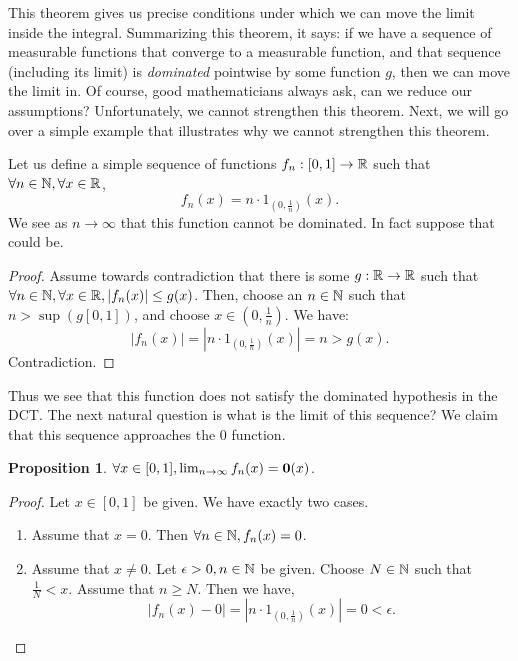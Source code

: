 \documentclass{article}
\theoremstyle{axiom} \newtheorem{axiom}{Axiom}
\theoremstyle{definition} \newtheorem{definition}{Definition}
\theoremstyle{example} \newtheorem{example}{Example}
\theoremstyle{proposition} \newtheorem{prop}{Proposition}
\theoremstyle{lemma} \newtheorem{lemma}{Lemma}
\begin{document}
This theorem gives us precise conditions under which we can move the limit
inside the integral. Summarizing this theorem, it says: if we have a sequence of
measurable functions that converge to a measurable function, and that sequence
(including its limit) is \textit{dominated} pointwise by some function $g$,
then we can move the limit in. Of course, good mathematicians always ask, can we reduce our
assumptions? Unfortunately, we cannot strengthen this theorem. Next, we will go
over a simple example that illustrates why we cannot strengthen this theorem.

Let us define a simple sequence of functions $f_n: [0,1] \rightarrow \mathbb{R}$ such
that $\forall n \in \mathbb{N}, \forall x \in \mathbb{R}$, 
\begin{equation*}
	f_n(x) = n \cdot 1_{(0,\frac{1}{n})}(x).
\end{equation*}
We see as $n \rightarrow \infty$ that this function cannot be dominated. In
fact suppose that could be.
\begin{proof}
Assume towards contradiction that there is some $g: \mathbb{R} \rightarrow \mathbb{R}$ such that
$\forall n \in \mathbb{N}, \forall x \in \mathbb{R}, |f_n(x)| \leq g(x)$. Then, choose an 
$n \in \mathbb{N}$ such that $n > \sup(g[0,1])$, and choose $x \in (0,\frac{1}{n})$. 
We have:
\begin{equation*}
	|f_n(x)| = |n\cdot 1_{(0,\frac{1}{n})}(x)| = n > g(x).
\end{equation*}
Contradiction.
\end{proof}

Thus we see that this function does not satisfy the dominated hypothesis in
the DCT. The next natural question is what is the limit of this sequence? We
claim that this sequence approaches the 0 function.
\begin{prop}
	$\forall x \in [0,1], \lim_{n\rightarrow \infty} f_n(x) = \bold{0}(x)$.
\end{prop}
\begin{proof}
	Let $x \in [0,1]$ be given. We have exactly two cases. 
	\begin{enumerate}
		\item Assume that $x = 0$. Then $\forall n \in \mathbb{N}, f_n(x) = 0$.
		\item Assume that $x\neq 0$. Let $\epsilon > 0, n\in \mathbb{N}$ be given.
		Choose $N \in \mathbb{N}$ such that $\frac{1}{N} <x$. Assume that $n \geq N$.
		Then we have,
		\begin{equation*}
			|f_n(x) - 0| = |n\cdot 1_{(0,\frac{1}{n})}(x)|  = 0 < \epsilon.
		\end{equation*}
	\end{enumerate}
\end{proof}
\end{document}
